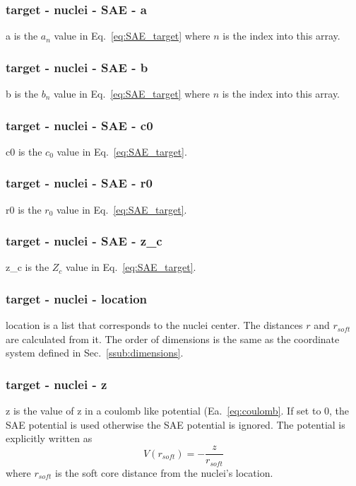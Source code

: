 \documentclass{article}
\begin{document}
\subsubsection{target - nuclei - SAE - a}
a is the $a_n$ value in Eq.~\ref{eq:SAE_target} where $n$ is the index into this array.

\subsubsection{target - nuclei - SAE - b}
b is the $b_n$ value in Eq.~\ref{eq:SAE_target} where $n$ is the index into this array.

\subsubsection{target - nuclei - SAE - c0}
c0 is the $c_0$ value in Eq.~\ref{eq:SAE_target}.

\subsubsection{target - nuclei - SAE - r0}
r0 is the $r_0$ value in Eq.~\ref{eq:SAE_target}.

\subsubsection{target - nuclei - SAE - z\_c}
z\_c is the $Z_c$ value in Eq.~\ref{eq:SAE_target}.

\subsubsection{target - nuclei - location}
location is a list that corresponds to the nuclei center. The distances $r$ and $r_{soft}$ are calculated from it. The order of dimensions is the same as the coordinate system defined in Sec.~\ref{ssub:dimensions}.

\subsubsection{target - nuclei - z}
z is the value of z in a coulomb like potential (Ea.~\ref{eq:coulomb}. If set to 0, the SAE potential is used otherwise the SAE potential is ignored. The potential is explicitly written as
\begin{equation}
  V(r_{soft}) = - \frac{z}{r_{soft}}
    \label{eq:coulomb}
\end{equation}
where $r_{soft}$ is the soft core distance from the nuclei's location.
\end{document}
